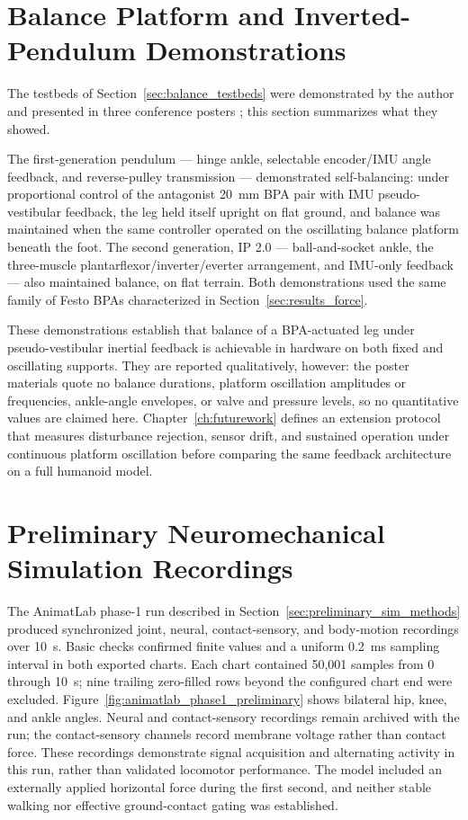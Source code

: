 \section{Balance Platform and Inverted-Pendulum Demonstrations}\label{sec:results_balance}

The testbeds of Section~\ref{sec:balance_testbeds} were demonstrated by the author and presented in three conference posters \citep{bolen_balance_2024, bolen_selfbalancing_2024, bolen_selfbalancing_srs_2024}; this section summarizes what they showed.

The first-generation pendulum --- hinge ankle, selectable encoder/IMU angle feedback, and reverse-pulley transmission --- demonstrated self-balancing: under proportional control of the antagonist \qty{20}{\mm} BPA pair with IMU pseudo-vestibular feedback, the leg held itself upright on flat ground, and balance was maintained when the same controller operated on the oscillating balance platform beneath the foot. The second generation, IP 2.0 --- ball-and-socket ankle, the three-muscle plantarflexor/inverter/everter arrangement, and IMU-only feedback --- also maintained balance, on flat terrain. Both demonstrations used the same family of Festo BPAs characterized in Section~\ref{sec:results_force}.

These demonstrations establish that balance of a BPA-actuated leg under pseudo-vestibular inertial feedback is achievable in hardware on both fixed and oscillating supports. They are reported qualitatively, however: the poster materials quote no balance durations, platform oscillation amplitudes or frequencies, ankle-angle envelopes, or valve and pressure levels, so no quantitative values are claimed here. Chapter~\ref{ch:futurework} defines an extension protocol that measures disturbance rejection, sensor drift, and sustained operation under continuous platform oscillation before comparing the same feedback architecture on a full humanoid model.

\section{Preliminary Neuromechanical Simulation Recordings}\label{sec:preliminary_sim_results}

The AnimatLab phase-1 run described in Section~\ref{sec:preliminary_sim_methods} produced synchronized joint, neural, contact-sensory, and body-motion recordings over \qty{10}{\second}. Basic checks confirmed finite values and a uniform \qty{0.2}{\milli\second} sampling interval in both exported charts. Each chart contained 50,001 samples from 0 through \qty{10}{\second}; nine trailing zero-filled rows beyond the configured chart end were excluded. Figure~\ref{fig:animatlab_phase1_preliminary} shows bilateral hip, knee, and ankle angles. Neural and contact-sensory recordings remain archived with the run; the contact-sensory channels record membrane voltage rather than contact force. These recordings demonstrate signal acquisition and alternating activity in this run, rather than validated locomotor performance. The model included an externally applied horizontal force during the first second, and neither stable walking nor effective ground-contact gating was established.

